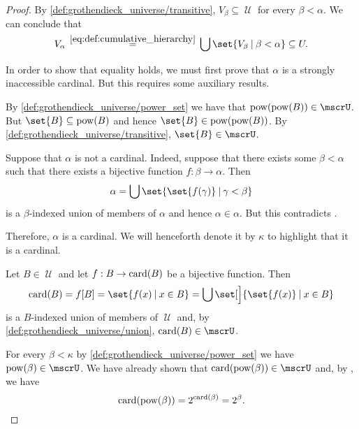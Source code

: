 \begin{proof}
   By \ref{def:grothendieck_universe/transitive}, \( V_\beta \subseteq \mscrU \) for every \( \beta < \alpha \). We can conclude that
  \begin{equation*}
    V_\alpha
    \reloset {\eqref{eq:def:cumulative_hierarchy}} =
    \bigcup\set{ V_\beta \given \beta < \alpha }
    \subseteq
    U.
  \end{equation*}

  In order to show that equality holds, we must first prove that \( \alpha \) is a strongly inaccessible cardinal. But this requires some auxiliary results.

   By \ref{def:grothendieck_universe/power_set} we have that \( \pow(\pow(B)) \in \mscrU \). But \( \set{ B } \subseteq \pow(B) \) and hence \( \set{ B } \in \pow(\pow(B)) \). By \ref{def:grothendieck_universe/transitive}, \( \set{ B } \in \mscrU \).

   Suppose that \( \alpha \) is not a cardinal. Indeed, suppose that there exists some \( \beta < \alpha \) such that there exists a bijective function \( f: \beta \to \alpha \). Then
  \begin{equation*}
    \alpha = \bigcup\set{ \set{ f(\gamma) } \given \gamma < \beta }
  \end{equation*}
  is a \( \beta \)-indexed union of members of \( \alpha \) and hence \( \alpha \in \alpha \). But this contradicts .

  Therefore, \( \alpha \) is a cardinal. We will henceforth denote it by \( \kappa \) to highlight that it is a cardinal.

   Let \( B \in \mscrU \) and let \( f: B \to \operatorname{card}(B) \) be a bijective function. Then
  \begin{equation*}
    \card(B)
    =
    f[B]
    =
    \set{ f(x) \given x \in B }
    =
    \bigcup\set[\Big]{ \set{ f(x) } \given x \in B }
  \end{equation*}
   is a \( B \)-indexed union of members of \( \mscrU \) and, by \ref{def:grothendieck_universe/union}, \( \card(B) \in \mscrU \).

   For every \( \beta < \kappa \) by \ref{def:grothendieck_universe/power_set} we have \( \pow(\beta) \in \mscrU \). We have already shown that \( \card(\pow(\beta)) \in \mscrU \) and, by , we have
  \begin{equation*}
    \operatorname{card}(\operatorname{pow}(\beta)) = 2^{\operatorname{card}(\beta)} = 2^\beta.
  \end{equation*}


\end{proof}
